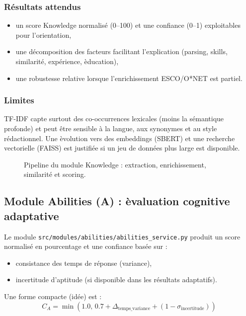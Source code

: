 \documentclass[11pt,a4paper]{article}
\begin{document}
\subsubsection*{R\'esultats attendus}
\begin{itemize}
    \item un score Knowledge normalis\'e (0--100) et une confiance (0--1) exploitables pour l'orientation,
    \item une d\'ecomposition des facteurs facilitant l'explication (parsing, skills, similarit\'e, exp\'erience, \`education),
    \item une robustesse relative lorsque l'enrichissement ESCO/O*NET est partiel.
\end{itemize}

\subsubsection*{Limites}
TF-IDF capte surtout des co-occurrences lexicales (moins la s\'emantique profonde) et peut \^etre sensible \`a la langue, aux synonymes et au style r\'edactionnel. Une \`evolution vers des embeddings (SBERT) et une recherche vectorielle (FAISS) est justifi\'ee si un jeu de donn\'ees plus large est disponible.

\begin{figure}[H]
    \centering
    
    \caption{Pipeline du module Knowledge : extraction, enrichissement, similarit\'e et scoring.}
    \label{fig:knowledge_pipeline}
\end{figure}

\subsection{Module Abilities (A) : \`evaluation cognitive adaptative}
Le module \texttt{src/modules/abilities/abilities\_service.py} produit un score normalis\'e en pourcentage et une confiance bas\'ee sur :
\begin{itemize}
    \item consistance des temps de r\'eponse (variance),
    \item incertitude d'aptitude (si disponible dans les r\'esultats adaptatifs).
\end{itemize}
Une forme compacte (id\'ee) est :
\begin{equation}
C_A = \min\left(1.0,\, 0.7 + \Delta_{\text{temps\_variance}} + (1 - \sigma_{\text{incertitude}})\right)
\end{equation}
\end{document}
